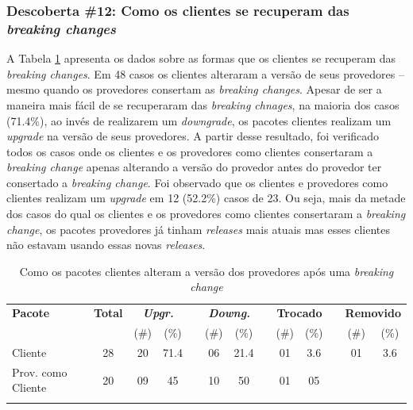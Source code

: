 \subsubsection{Descoberta \#12: Como os clientes se recuperam das \textit{breaking changes}}

A Tabela \ref{tab:version_change} apresenta os dados sobre as formas que os clientes se recuperam das \textit{breaking changes}. Em 48 casos os clientes alteraram a versão de seus provedores -- mesmo quando os provedores consertam as \textit{breaking changes}. Apesar de ser a maneira mais fácil de se recuperaram das \textit{breaking chnages}, na maioria dos casos (71.4\%), ao invés de realizarem um \textit{downgrade}, os pacotes clientes realizam um \textit{upgrade} na versão de seus provedores. A partir desse resultado, foi verificado todos os casos onde os clientes e os provedores como clientes consertaram a \textit{breaking change} apenas alterando a versão do provedor antes do provedor ter consertado a \textit{breaking change}. Foi observado que os clientes e provedores como clientes realizam um \textit{upgrade} em 12 (52.2\%) casos de 23. Ou seja, mais da metade dos casos do qual os clientes e os provedores como clientes consertaram a \textit{breaking change}, os pacotes provedores já tinham \textit{releases} mais atuais mas esses clientes não estavam usando essas novas \textit{releases}.

\begin{table}
	\centering
	\caption{Como os pacotes clientes alteram a versão dos provedores após uma \textit{breaking change}}
	\begin{tabular}{lcccccccccccc} \toprule
		\textbf{Pacote} & \textbf{Total} & \multicolumn{2}{c}{\textbf{\textit{Upgr.}}} & \phantom{ab} & \multicolumn{2}{c}{\textbf{\textit{Downg.}}} & \phantom{ab} & \multicolumn{2}{c}{\textbf{Trocado}} & \phantom{ab} & \multicolumn{2}{c}{\textbf{Removido}}
		\\ \cmidrule{3-4} \cmidrule{6-7} \cmidrule{9-10} \cmidrule{12-13}
		           &    & (\#) & (\%) && (\#) & (\%) && (\#) & (\%) && (\#) & (\%) \\ \midrule
		Cliente     & 28 & 20   & 71.4 && 06   & 21.4 && 01   & 3.6  &&  01  & 3.6  \\
		Prov. como Cliente & 20 & 09   & 45 && 10   & 50 && 01   & 05  && \textemdash & \textemdash \\ \bottomrule
		\label{tab:version_change}
	\end{tabular}
\end{table}

